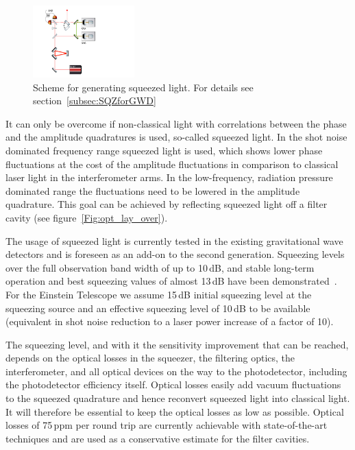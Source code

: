 \begin{figure}
	\centering
		\includegraphics[width=0.35\textwidth]{Intro/Intro_Figures/SqzGenIntro.pdf}
	\caption{Scheme for generating squeezed light. For details see section~\ref{subsec:SQZforGWD}}
	\label{fig:SqzGenIntro}
\end{figure} 

It can only be overcome if non-classical light with correlations between the phase 
and the amplitude quadratures is used, so-called squeezed light. In the shot noise 
dominated frequency range squeezed light is used, which shows lower phase 
fluctuations at the cost of the amplitude fluctuations in comparison to classical 
laser light in the interferometer arms. In the low-frequency, radiation pressure 
dominated range the fluctuations need to be lowered in the amplitude quadrature. 
This goal can be achieved by reflecting squeezed light off a filter cavity (see 
figure~\ref{Fig:opt_lay_over}). 

The usage of squeezed light is currently tested in the existing gravitational wave 
detectors and is foreseen as an add-on to the second generation. Squeezing 
levels over the full observation band width of up to 10\,dB, and stable long-term 
operation and best squeezing values of almost 13\,dB have been demonstrated~\cite{Eberle2010}. 
For the Einstein Telescope we assume 15\,dB initial squeezing 
level at the squeezing source and an effective squeezing level of 10\,dB to be 
available (equivalent in shot noise reduction to a laser power increase of a factor
of 10). 

The squeezing level, and with it the sensitivity improvement that can be reached, 
depends on the optical losses in the squeezer, the filtering optics, the interferometer, 
and all optical devices on the way to the photodetector, including the photodetector 
efficiency itself. Optical losses easily add vacuum fluctuations to the squeezed quadrature 
and hence reconvert squeezed light into classical light. It will therefore be essential 
to keep the optical losses as low as possible. Optical losses of 75\,ppm per round 
trip are currently achievable with state-of-the-art techniques and are used as a 
conservative estimate for the filter cavities.

